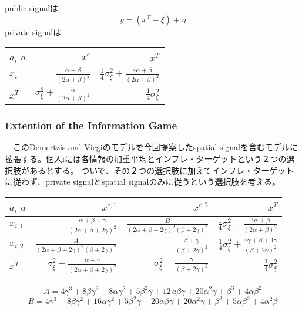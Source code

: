 \documentclass{jsarticle}
\begin{document}
public signalは
$$ y = (x^{T} - \xi) + \eta $$
private signalは


\begin{table}[htb]
\begin{center}
  \begin{tabular}{|l||r|r|} \hline
    $a_{i}$ $\bar{a}$& $x^{e}$ & $x^{T}$ \\ \hline \hline
    $x_{i}$ & $\frac{\alpha + \beta}{(2\alpha + \beta)^{2}}$ & $\frac{1}{4}\sigma^{2}_{\xi} + \frac{4\alpha + \beta}{(2\alpha + \beta)^{2}}$\\ 
    $x^{T}$ & $\sigma^{2}_{\xi} + \frac{\alpha }{(2\alpha + \beta)^{2}}$ & $\frac{1}{4}\sigma^{2}_{\xi}$ \\ \hline
  \end{tabular}
  \end{center}
\end{table}



\subsubsection{Extention of the Information Game}
　このDemertzis and Viegiのモデルを今回提案したspatial signalを含むモデルに拡張する。個人iには各情報の加重平均とインフレ・ターゲットという２つの選択肢があるとする。
ついで、その２つの選択肢に加えてインフレ・ターゲットに従わず、private signalとspatial signalのみに従うという選択肢を考える。

\begin{table}
\begin{center}
  \begin{tabular}{|l||r|r|r|} \hline
    $a_{i}$ $\bar{a}$&  $x^{e, 1}$ & $x^{e, 2}$ & $x^{T}$ \\ \hline \hline
    
    $x_{i, 1}$ & $\frac{\alpha + \beta + \gamma}{(2\alpha + \beta + 2\gamma)^{2}}$ & $\frac{B}{(2\alpha + \beta + 2\gamma)^2(\beta + 2\gamma)^2}$ & $\frac{1}{4}\sigma^{2}_{\xi} + \frac{4\alpha + \beta}{(2\alpha + \beta)^{2}}$\\
    
    $x_{i, 2}$ & $\frac{A}{(2\alpha + \beta + 2\gamma)^2(\beta + 2\gamma)^2}$ & $\frac{\beta + \gamma}{(\beta + 2\gamma)^{2}}$ & $\frac{1}{4}\sigma^{2}_{\xi} + \frac{4\gamma + \beta + 4\gamma}{(\beta + 2\gamma)^{2}}$\\ 
    $x^{T}$ & $\sigma^{2}_{\xi} + \frac{\alpha + \gamma}{(2\alpha + \beta + 2\gamma)^{2}}$ & $\sigma^{2}_{\xi} + \frac{\gamma }{(\beta + 2\gamma)^{2}}$ & $\frac{1}{4}\sigma^{2}_{\xi}$ \\ \hline
    
  \end{tabular}
  \end{center}
  
$$A=4\gamma^3+8\beta\gamma^2-8\alpha\gamma^2+5\beta^2\gamma+12\,a\beta\gamma+20\alpha^2\gamma+\beta^3+4\alpha\beta^2$$
$$B=4\gamma^3+8\beta\gamma^2+16\alpha\gamma^2+5\beta^2\gamma+20\alpha\beta\gamma+20\alpha^2\gamma+\beta^3+5\alpha\beta^2+4\alpha^2\beta$$
\end{table}
\end{document}
